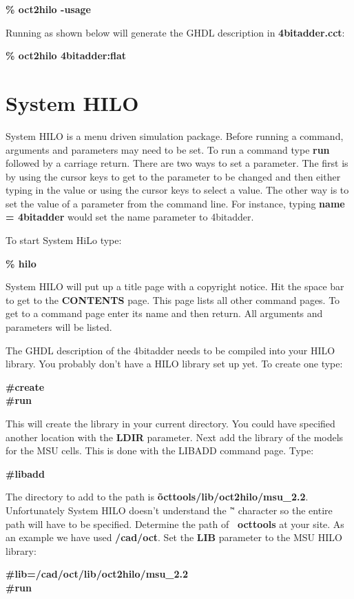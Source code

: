 {\bf   \% oct2hilo -usage}

  Running as shown below will generate the GHDL description in 
{\bf 4bitadder.cct}:

{\bf   \% oct2hilo 4bitadder:flat}


\section{System HILO}

  System HILO is a menu driven simulation package.  Before running
a command, arguments and parameters may need to be set.  To run a command
type {\bf run} followed by a carriage return.  There are two ways to set 
a parameter.  The first is by using the cursor keys to get to the
parameter to be changed and then either typing in the value or using
the cursor keys to select a value.  The other way is to set the value
of a parameter from the command line.  For instance, typing 
{\bf name = 4bitadder} would set the name parameter to 4bitadder.

  To start System HiLo type:

{\bf   \% hilo}

  System HILO will put up a title page with a copyright notice.  Hit
the space bar to get to the {\bf CONTENTS} page.  This page lists all other
command pages.  To get to a command page enter its name and then return.
All arguments and parameters will be listed.  

  The GHDL description of the 4bitadder needs to be compiled into your
HILO library.  You probably don't have a HILO library set up yet.  To
create one type:
  
{\bf   \#create}\\
{\bf   \#run}

  This will create the library in your current directory.  You could have
specified another location with the {\bf LDIR} parameter.  Next add
the library of the models for the MSU cells.  This is done with the LIBADD
command page.  Type:

{\bf   \#libadd}

  The directory to add to the path is {\bf \~octtools/lib/oct2hilo/msu\_2.2}.
Unfortunately System HILO doesn't understand the '\~' character so the
entire path will have to be specified.  Determine the path of {\bf ~octtools}
at your site.  As an example we have used {\bf /cad/oct}.  Set the {\bf LIB}
parameter to the MSU HILO library:

{\bf   \#lib=/cad/oct/lib/oct2hilo/msu\_2.2}\\
{\bf   \#run}


